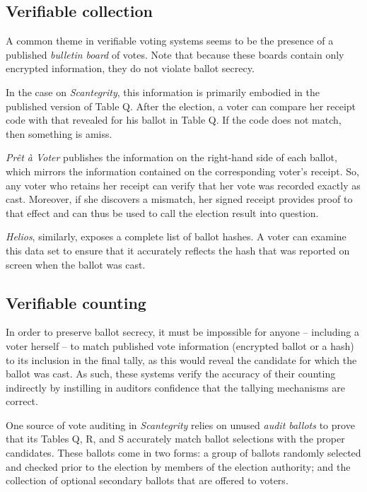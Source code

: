 \documentclass[10pt,twocolumn]{article}
\newcommand{\term}[1]{\textit{#1}}
\newcommand{\preta}{Pr\^{e}t \`{a}}
\newcommand{\pv}{\preta{} Voter}
\begin{document}
\subsection{Verifiable collection}

A common theme in verifiable voting systems seems to be the presence of a published \term{bulletin
board} of votes. Note that because these boards contain only encrypted information, they do not
violate ballot secrecy.

In the case on \term{Scantegrity}, this information is primarily embodied in the published version of Table
Q. After the election, a voter can compare her receipt code with that revealed for his ballot in
Table Q. If the code does not match, then something is amiss.

\term{\pv{}} publishes the information on the right-hand side of each ballot, which mirrors the information contained on the corresponding voter's receipt.
So, any voter who retains her receipt can verify that her vote was recorded exactly as cast.
Moreover, if she discovers a mismatch, her signed receipt provides proof to that effect and can thus be used to call
the election result into question.

\term{Helios}, similarly, exposes a complete list of ballot hashes. A voter can examine this data set to
ensure that it accurately reflects the hash that was reported on screen when the ballot was cast.

\subsection{Verifiable counting}

In order to preserve ballot secrecy, it must be impossible for anyone -- including a voter
herself -- to match published vote information (encrypted ballot or a hash) to its inclusion in
the final tally, as this would reveal the candidate for which the ballot was cast. As such, these
systems verify the accuracy of their counting indirectly by instilling in auditors confidence that
the tallying mechanisms are correct.

One source of vote auditing in \term{Scantegrity} relies on unused \term{audit ballots} to prove that its
Tables Q, R, and S accurately match ballot selections with the proper candidates. These ballots come
in two forms: a group of ballots randomly selected and checked prior to the election by members of
the election authority; and the collection of optional secondary ballots that are offered to voters.
\end{document}
